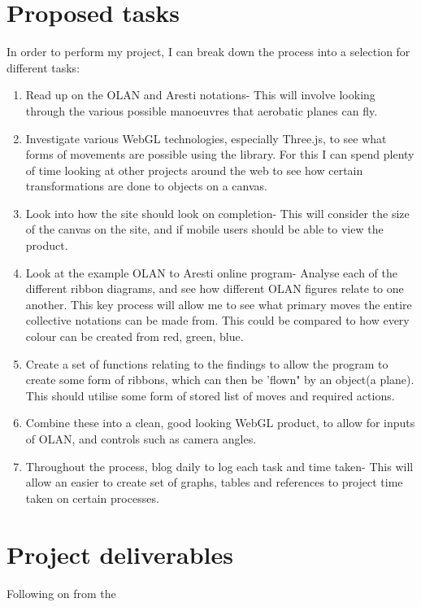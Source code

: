 \documentclass[11pt,fleqn,twoside]{article}
\begin{document}
\section{Proposed tasks}
In order to perform my project, I can break down the process into a selection for different tasks:
\begin{enumerate}
\item Read up on the OLAN and Aresti notations- This will involve looking through the various possible manoeuvres that aerobatic planes can fly.
\item Investigate various WebGL technologies, especially Three.js, to see what forms of movements are possible using the library. For this I can spend plenty of time looking at other projects around the web to see how certain transformations are done to objects on a canvas.
\item Look into how the site should look on completion- This will consider the size of the canvas on the site, and if mobile users should be able to view the product.
\item Look at the example OLAN to Aresti online program- Analyse each of the different ribbon diagrams, and see how different OLAN figures relate to one another. This key process will allow me to see what primary moves the entire collective notations can be made from. This could be compared to how every colour can be created from red, green, blue.
\item Create a set of functions relating to the findings to allow the program to create some form of ribbons, which can then be 'flown" by an object(a plane). This should utilise some form of stored list of moves and required actions.
\item Combine these into a clean, good looking WebGL product, to allow for inputs of OLAN, and controls such as camera angles.
\item Throughout the process, blog daily to log each task and time taken- This will allow an easier to create set of graphs, tables and references to project time taken on certain processes.
\end{enumerate}

\section{Project deliverables}
Following on from the 
\end{document}
